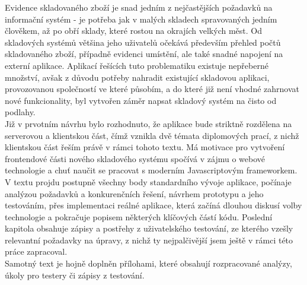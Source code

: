 Evidence skladovaného zboží je snad jedním z nejčastějších požadavků na informační systém - je potřeba jak v malých skladech spravovaných jedním člověkem, až po obří sklady, které rostou na okrajích velkých měst. Od skladových systémů většina jeho uživatelů očekává především přehled počtů skladovaného zboží, případně evidenci umístění, ale také snadné napojení na externí aplikace. Aplikací řešících tuto problematiku existuje nepřeberné množství, avšak z důvodu potřeby nahradit existující skladovou aplikaci, provozovanou společností ve které působím, a do které již není vhodné zahrnovat nové funkcionality, byl vytvořen záměr napsat skladový systém na čisto od podlahy.\\
Již v prvotním návrhu bylo rozhodnuto, že aplikace bude striktně rozdělena na serverovou a klientskou část, čímž vznikla dvě témata diplomových prací, z nichž klientskou část řeším právě v rámci tohoto textu. Má motivace pro vytvoření frontendové části nového skladového systému spočívá v zájmu o webové technologie a chuť naučit se pracovat s moderním Javascriptovým frameworkem.\\
V textu projdu postupně všechny body standardního vývoje aplikace, počínaje analýzou požadavků a konkurenčních řešení, návrhem prototypu a jeho testováním, přes implementaci reálné aplikace, která začíná dlouhou diskusí volby technologie a pokračuje popisem některých klíčových částí kódu. Poslední kapitola obsahuje zápisy a postřehy z uživatelského testování, ze kterého vzešly relevantní požadavky na úpravy, z nichž ty nejpalčivější jsem ještě v rámci této práce zapracoval.\\
Samotný text je hojně doplněn přílohami, které obsahují rozpracované analýzy, úkoly pro testery či zápisy z testování.
